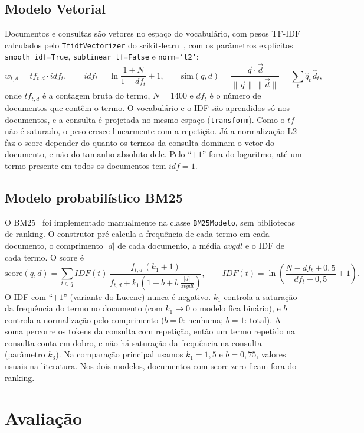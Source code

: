 \documentclass[10pt,a4paper]{article}
\begin{document}
\subsection{Modelo Vetorial}
Documentos e consultas são vetores no espaço do vocabulário, com pesos TF-IDF calculados pelo \texttt{TfidfVectorizer} do scikit-learn~\cite{sklearn}, com os parâmetros explícitos \texttt{smooth\_idf=True}, \texttt{sublinear\_tf=False} e \texttt{norm='l2'}:
\[
  w_{t,d} = tf_{t,d}\cdot idf_t,\qquad idf_t = \ln\frac{1+N}{1+df_t} + 1,\qquad
  \mathrm{sim}(q,d)=\frac{\vec q\cdot\vec d}{\lVert\vec q\rVert\,\lVert\vec d\rVert}=\sum_t \hat q_t\,\hat d_t ,
\]
onde $tf_{t,d}$ é a contagem bruta do termo, $N=1400$ e $df_t$ é o número de documentos que contêm o termo. O vocabulário e o IDF são aprendidos só nos documentos, e a consulta é projetada no mesmo espaço (\texttt{transform}). Como o $tf$ não é saturado, o peso cresce linearmente com a repetição. Já a normalização L2 faz o score depender do quanto os termos da consulta dominam o vetor do documento, e não do tamanho absoluto dele. Pelo ``$+1$'' fora do logaritmo, até um termo presente em todos os documentos tem $idf=1$.

\subsection{Modelo probabilístico BM25}
O BM25~\cite{robertson} foi implementado manualmente na classe \texttt{BM25Modelo}, sem bibliotecas de ranking. O construtor pré-calcula a frequência de cada termo em cada documento, o comprimento $|d|$ de cada documento, a média $avgdl$ e o IDF de cada termo. O score é
\[
  \mathrm{score}(q,d)=\sum_{t\in q} IDF(t)\,\frac{f_{t,d}\,(k_1+1)}{f_{t,d}+k_1\!\left(1-b+b\,\frac{|d|}{avgdl}\right)},\qquad
  IDF(t)=\ln\!\left(\frac{N-df_t+0{,}5}{df_t+0{,}5}+1\right).
\]
O IDF com ``$+1$'' (variante do Lucene) nunca é negativo. $k_1$ controla a saturação da frequência do termo no documento (com $k_1\to0$ o modelo fica binário), e $b$ controla a normalização pelo comprimento ($b=0$: nenhuma; $b=1$: total). A soma percorre os tokens da consulta com repetição, então um termo repetido na consulta conta em dobro, e não há saturação da frequência na consulta (parâmetro $k_3$). Na comparação principal usamos $k_1=1{,}5$ e $b=0{,}75$, valores usuais na literatura. Nos dois modelos, documentos com score zero ficam fora do ranking.

\section{Avaliação}
\end{document}
